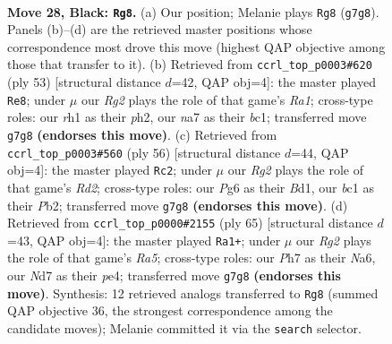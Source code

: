 \documentclass[11pt]{article}
\begin{document}
\clearpage

\begin{figure}[p]\centering
\begin{subfigure}{0.46\textwidth}\centering
\resizebox{\linewidth}{!}{%
\newchessgame
\chessboard[
  setfen={4k3/Nppnp1rp/6p1/p7/5P1P/2P2K2/P1n2P2/2B4R b - - 2 28},
  showmover=false,
  pgfstyle=straightmove, color=movearrow, markmove={g7-g8}
]}
\caption{}
\end{subfigure}\hfill
\begin{subfigure}{0.46\textwidth}\centering
\resizebox{\linewidth}{!}{%
\newchessgame
\chessboard[
  setfen={r5k1/pp6/4Nbp1/n3pp2/P1P5/2P5/1P4PP/2BR2K1 b - - 0 27},
  showmover=false,
  pgfstyle=straightmove, color=movearrow, markmove={a8-e8}
]}
\caption{}
\end{subfigure}
\\[4pt]
\begin{subfigure}{0.46\textwidth}\centering
\resizebox{\linewidth}{!}{%
\newchessgame
\chessboard[
  setfen={1r3bk1/5pp1/4p2p/p7/2p5/4P3/PP1R1PPP/3B1K2 w - - 0 29},
  showmover=false,
  pgfstyle=straightmove, color=movearrow, markmove={d2-c2}
]}
\caption{}
\end{subfigure}\hfill
\begin{subfigure}{0.46\textwidth}\centering
\resizebox{\linewidth}{!}{%
\newchessgame
\chessboard[
  setfen={8/5pk1/n1Pp2p1/7p/rp2PP2/6P1/1R4BP/6K1 b - - 0 33},
  showmover=false,
  pgfstyle=straightmove, color=movearrow, markmove={a4-a1}
]}
\caption{}
\end{subfigure}
\caption{\textbf{Move 28, Black: \texttt{Rg8}.} (a) Our position; Melanie plays \texttt{Rg8} (\texttt{g7g8}). Panels (b)--(d) are the retrieved master positions whose correspondence most drove this move (highest QAP objective among those that transfer to it). (b) Retrieved from \texttt{ccrl\_top\_p0003\#620} (ply 53) [structural distance $d$=42, QAP obj=4]: the master played \texttt{Re8}; under $\mu$ our \emph{Rg2} plays the role of that game's \emph{Ra1}; cross-type roles: our \emph{r}h1 as their \emph{p}h2, our \emph{n}a7 as their \emph{b}c1; transferred move \texttt{g7g8} \textbf{(endorses this move)}. (c) Retrieved from \texttt{ccrl\_top\_p0003\#560} (ply 56) [structural distance $d$=44, QAP obj=4]: the master played \texttt{Rc2}; under $\mu$ our \emph{Rg2} plays the role of that game's \emph{Rd2}; cross-type roles: our \emph{P}g6 as their \emph{B}d1, our \emph{b}c1 as their \emph{P}b2; transferred move \texttt{g7g8} \textbf{(endorses this move)}. (d) Retrieved from \texttt{ccrl\_top\_p0000\#2155} (ply 65) [structural distance $d$=43, QAP obj=4]: the master played \texttt{Ra1+}; under $\mu$ our \emph{Rg2} plays the role of that game's \emph{Ra5}; cross-type roles: our \emph{P}h7 as their \emph{N}a6, our \emph{N}d7 as their \emph{p}e4; transferred move \texttt{g7g8} \textbf{(endorses this move)}. Synthesis: 12 retrieved analogs transferred to \texttt{Rg8} (summed QAP objective 36, the strongest correspondence among the candidate moves); Melanie committed it via the \texttt{search} selector.}
\label{fig:thought-m55}
\end{figure}
\end{document}
